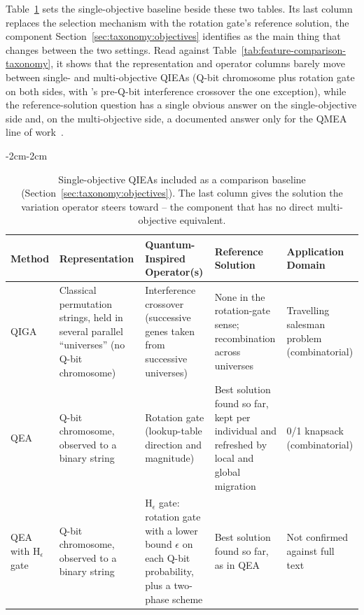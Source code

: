 Table~\ref{tab:feature-comparison-so} sets the single-objective
baseline beside these two tables. Its last column replaces the
selection mechanism with the rotation gate's reference solution, the
component Section~\ref{sec:taxonomy:objectives} identifies as the main
thing that changes between the two settings. Read against
Table~\ref{tab:feature-comparison-taxonomy}, it shows that the
representation and operator columns barely move between single- and
multi-objective QIEAs (Q-bit chromosome plus rotation gate on both
sides, with \citet{narayanan1996qiga}'s pre-Q-bit interference
crossover the one exception), while the reference-solution question
has a single obvious answer on the single-objective side and, on the
multi-objective side, a documented answer only for the QMEA line of
work~\citep{ryu2014dmqea}.

\begin{table}[htbp]
  \centering
  \small
  \caption{Single-objective QIEAs included as a comparison baseline
    (Section~\ref{sec:taxonomy:objectives}). The last column gives the
    solution the variation operator steers toward -- the component that
    has no direct multi-objective equivalent.}
  \label{tab:feature-comparison-so}
  \begin{adjustwidth}{-2cm}{-2cm}
  \centering
  \begin{tabularx}{\linewidth}{@{}p{2.1cm}XXXX@{}}
    \toprule
    Method & Representation & Quantum-Inspired Operator(s) & Reference
    Solution & Application Domain \\
    \midrule
    QIGA~\citep{narayanan1996qiga} &
      Classical permutation strings, held in several parallel
      ``universes'' (no Q-bit chromosome) &
      Interference crossover (successive genes taken from successive
      universes) &
      None in the rotation-gate sense; recombination across
      universes &
      Travelling salesman problem (combinatorial) \\
    QEA~\citep{han2002qea} &
      Q-bit chromosome, observed to a binary string &
      Rotation gate (lookup-table direction and magnitude) &
      Best solution found so far, kept per individual and refreshed by
      local and global migration &
      0/1 knapsack (combinatorial) \\
    QEA with H$_\epsilon$ gate~\citep{han2004hepsilon} &
      Q-bit chromosome, observed to a binary string &
      H$_\epsilon$ gate: rotation gate with a lower bound $\epsilon$ on
      each Q-bit probability, plus a two-phase scheme &
      Best solution found so far, as in QEA &
      Not confirmed against full text \\
    \bottomrule
  \end{tabularx}
  \end{adjustwidth}
\end{table}
